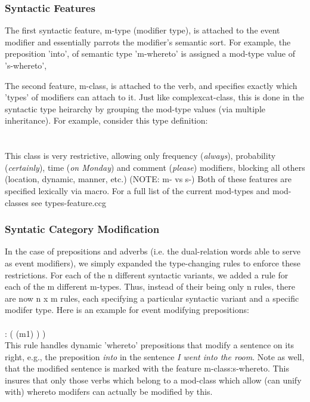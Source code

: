 \subsubsection{Syntactic Features}
The first syntactic feature, m-type (modifier type), is attached to the event modifier and essentially parrots the modifier's semantic sort. For example, the preposition 'into', of semantic type 'm-whereto' is assigned a mod-type value of 's-whereto', 

The second feature, m-class, is attached to the verb, and specifies exactly which 'types' of modifiers can attach to it. Just like complexcat-class, this is done in the syntactic type heirarchy by grouping the mod-type values (via multiple inheritance). For example, consider this type definition:\\ 

        \\\\
This class is very restrictive, allowing only frequency (\emph{always}), probability (\emph{certainly}), time (\emph{on Monday}) and comment (\emph{please}) modifiers, blocking all others (location, dynamic, manner, etc.) (NOTE: m- vs s-) Both of these features are specified lexically via macro. For a full list of the current mod-types and mod-classes see types-feature.ccg

\subsubsection{Syntatic Category Modification}
In the case of prepositions and adverbs (i.e. the dual-relation words able to serve as event modifiers), we simply expanded the type-changing rules to enforce these restrictions. For each of the n different syntactic variants, we added a rule for each of the m different  m-types. Thus, instead of their being only n rules, there are now n x m rules, each specifying a particular syntactic variant and a specific modifer type. Here is an example for event modifying prepositions:\\

\\ \arrow 
{}  : (  (m1) ) ) \\

This rule handles dynamic 'whereto' prepositions that modify a sentence on its right, e.g., the preposition \emph{into} in the sentence \emph{I went into the room}. Note as well, that the modified sentence is marked with the feature m-class:s-whereto. This insures that only those verbs which belong to a mod-class which allow (can unify with) whereto modifers can actually be modified by this.

